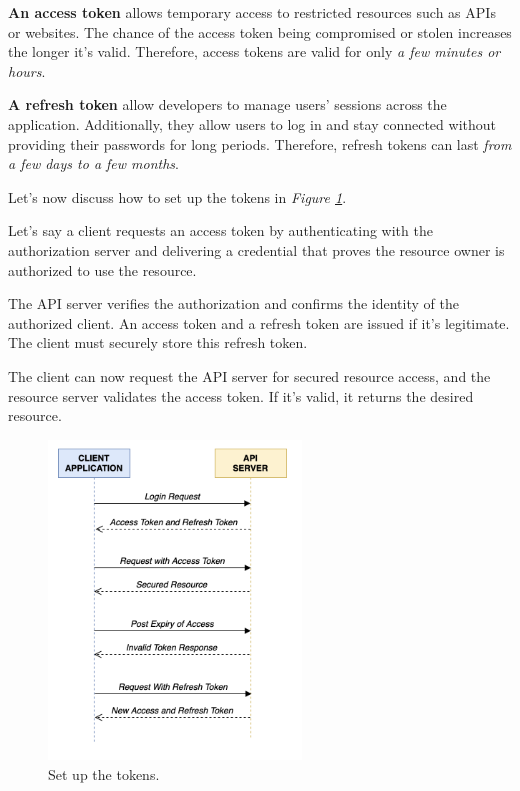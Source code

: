 \textbf{An access token} allows temporary access to restricted resources such as APIs or websites. The chance of the access token being compromised or stolen increases the longer it’s valid. Therefore, access tokens are valid for only \textit{a few minutes or hours}.

\textbf{A refresh token} allow developers to manage users’ sessions across the application. Additionally, they allow users to log in and stay connected without providing their passwords for long periods. Therefore, refresh tokens can last \textit{from a few days to a few months}.

Let’s now discuss how to set up the tokens in \textit{Figure \ref{fig:tokens-flow}}.

Let’s say a client requests an access token by authenticating with the authorization server and delivering a credential that proves the resource owner is authorized to use the resource.

The API server verifies the authorization and confirms the identity of the authorized client. An access token and a refresh token are issued if it’s legitimate. The client must securely store this refresh token.

The client can now request the API server for secured resource access, and the resource server validates the access token. If it’s valid, it returns the desired resource.

\begin{figure}[H]
    \centering
    \includegraphics[width=0.6\textwidth]{Figures/Implementation/Tokens.png}
    \caption{Set up the tokens.}
    \label{fig:tokens-flow}
\end{figure}

